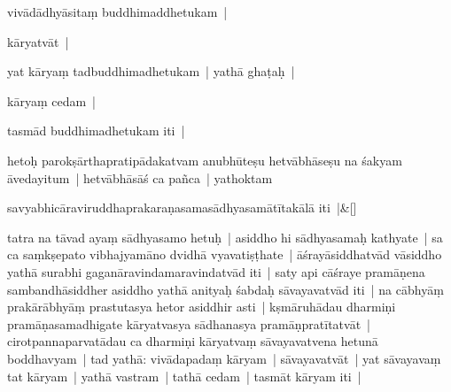 \documentclass[article,12pt,a4paper]{memoir}%
\newcounter{parCount}
\begin{document}
	  
	  \pstart \leavevmode%
	vivādādhyāsitaṃ buddhimaddhetukam |
	{}
	\pend%
      

	  
	  \pstart \leavevmode%
	kāryatvāt |
	{}
	\pend%
      

	  
	  \pstart \leavevmode%
	\label{ratnakīrtinibandhāvali__36r1N54TCOWEVAFTA4YDV06M4DM}yat kāryaṃ tadbuddhimadhetukam | yathā ghaṭaḥ |
	{}
	\pend%
      

	  
	  \pstart \leavevmode%
	kāryaṃ cedam |
	{}
	\pend%
      

	  
	  \pstart \leavevmode%
	tasmād buddhimadhetukam iti |
	{}
	\pend%
      

	  
	  \pstart \leavevmode%
	\label{thakur75-32.21}hetoḥ parokṣārthapratipādakatvam anubhūteṣu hetvābhāseṣu na śakyam āvedayitum | hetvābhāsāś ca pañca | yathoktam
	{}
	\pend%
      
	    
	    \stanza[\smallbreak]
	  savyabhicāraviruddhaprakaraṇasamasādhyasamātītakālā iti |\&[\smallbreak]
	  
	  
	  

	  
	  \pstart \leavevmode%
	\label{thakur75-32.24}tatra na tāvad ayaṃ sādhyasamo hetuḥ | asiddho hi sādhyasamaḥ kathyate | sa ca saṃkṣepato vibhajyamāno dvidhā vyavatiṣṭhate | āśrayāsiddhatvād vāsiddho yathā surabhi gaganāravindamaravindatvād iti | saty api cāśraye pramāṇena sambandhāsiddher asiddho yathā anityaḥ śabdaḥ sāvayavatvād iti | na cābhyāṃ prakārābhyāṃ prastutasya hetor asiddhir asti | \label{ratnakīrtinibandhāvali__36r1N54T2H6NLF3JHCUF8B8TWUQ}kṣmāruhādau dharmiṇi pramāṇasamadhigate kāryatvasya sādhanasya pramāṇpratītatvāt | cirotpannaparvatādau ca dharmiṇi kāryatvaṃ sāvayavatvena hetunā boddhavyam | tad yathā: vivādapadaṃ kāryam | sāvayavatvāt | yat sāvayavaṃ tat kāryam | yathā vastram | tathā cedam | tasmāt kāryam iti |
	{}
	\pend%
      
\end{document}
